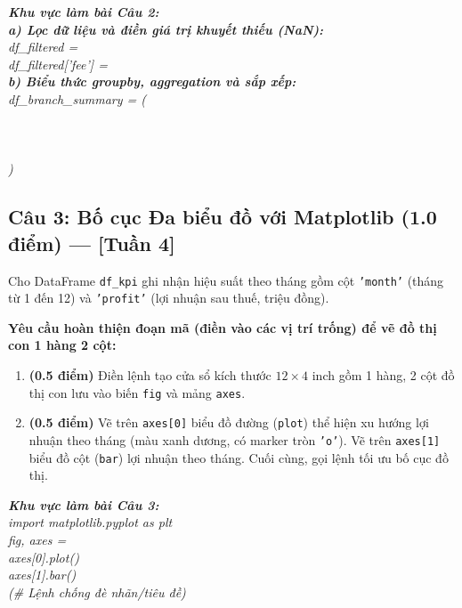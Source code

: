 \documentclass[11pt,a4paper]{article}
\newcommand{\answerbox}[2]{
  \vspace{1mm}
  \begin{tcolorbox}[
    colback=white,
    colframe=gray!60,
    boxrule=0.6pt,
    arc=2pt,
    height=#1,
    left=3mm, right=3mm, top=2mm, bottom=2mm
  ]
  \small\textit{\color{gray}#2}
  \end{tcolorbox}
  \vspace{1mm}
}
\begin{document}
\answerbox{14.0cm}{
\textbf{Khu vực làm bài Câu 2:}\\[3mm]
\textbf{a) Lọc dữ liệu và điền giá trị khuyết thiếu (NaN):}\\
df\_filtered = \dotfill\\[4mm]
df\_filtered['fee'] = \dotfill\\[7mm]
\textbf{b) Biểu thức groupby, aggregation và sắp xếp:}\\
df\_branch\_summary = (\dotfill\\[5mm]
\hspace*{3.5cm}\dotfill\\[5mm]
\hspace*{3.5cm}\dotfill\\[5mm]
\hspace*{3.5cm}\dotfill\\[5mm]
\hspace*{3.5cm}\dotfill)\\[5mm]
\dotfill
}

\newpage
\subsection*{Câu 3: Bố cục Đa biểu đồ với Matplotlib (1.0 điểm) --- [Tuần 4]}
Cho DataFrame \texttt{df\_kpi} ghi nhận hiệu suất theo tháng gồm cột \texttt{'month'} (tháng từ 1 đến 12) và \texttt{'profit'} (lợi nhuận sau thuế, triệu đồng).

\noindent
\textbf{Yêu cầu hoàn thiện đoạn mã (điền vào các vị trí trống) để vẽ đồ thị con 1 hàng 2 cột:}
\begin{enumerate}[label=\textbf{\alph*)}]
  \item \textbf{(0.5 điểm)} Điền lệnh tạo cửa sổ kích thước $12 \times 4$ inch gồm 1 hàng, 2 cột đồ thị con lưu vào biến \texttt{fig} và mảng \texttt{axes}.
  \item \textbf{(0.5 điểm)} Vẽ trên \texttt{axes[0]} biểu đồ đường (\texttt{plot}) thể hiện xu hướng lợi nhuận theo tháng (màu xanh dương, có marker tròn \texttt{'o'}). Vẽ trên \texttt{axes[1]} biểu đồ cột (\texttt{bar}) lợi nhuận theo tháng. Cuối cùng, gọi lệnh tối ưu bố cục đồ thị.
\end{enumerate}

\answerbox{3.8cm}{
\textbf{Khu vực làm bài Câu 3:}\\
import matplotlib.pyplot as plt\\[1.5mm]
fig, axes = \dotfill\\[2.5mm]
axes[0].plot(\dotfill)\\[2.5mm]
axes[1].bar(\dotfill)\\[2.5mm]
\dotfill \quad \textit{(\# Lệnh chống đè nhãn/tiêu đề)}
}
\end{document}
